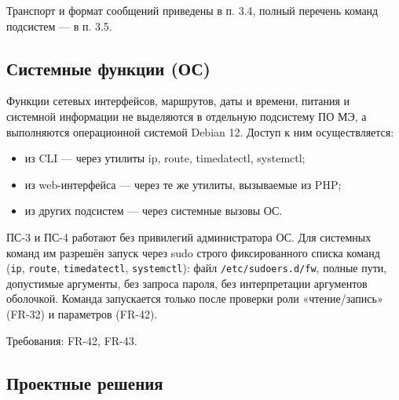 \documentclass[13pt,a4paper,final]{article}
\begin{document}
	Транспорт и формат сообщений приведены в п. 3.4, полный перечень команд подсистем --- в п. 3.5.
	\subsection{Системные функции (ОС)}
	
	Функции сетевых интерфейсов, маршрутов, даты и времени, питания и системной информации не выделяются в отдельную подсистему ПО МЭ, а выполняются операционной системой Debian 12. Доступ к ним осуществляется:
	\begin{itemize}
		\item из CLI — через утилиты ip, route, timedatectl, systemctl;
		\item из web-интерфейса — через те же утилиты, вызываемые из PHP;
		\item из других подсистем — через системные вызовы ОС.
	\end{itemize}
	
	ПС-3 и ПС-4 работают без привилегий администратора ОС. Для системных команд им разрешён запуск через sudo строго фиксированного списка команд (\texttt{ip}, \texttt{route}, \texttt{timedatectl}, \texttt{systemctl}): файл \texttt{/etc/sudoers.d/fw}, полные пути, допустимые аргументы, без запроса пароля, без интерпретации аргументов оболочкой. Команда запускается только после проверки роли «чтение/запись» (FR-32) и параметров (FR-42).
	
	Требования: FR-42, FR-43.
	
	\subsection{Проектные решения}
	
\end{document}

